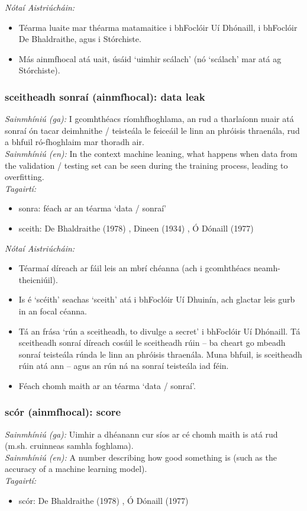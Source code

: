  \noindent \textit{Nótaí Aistriúcháin:}
\begin{itemize}
	\item Téarma luaite mar théarma matamaitice i bhFoclóir Uí Dhónaill, i bhFoclóir De Bhaldraithe, agus i Stórchiste.
	\item Más ainmfhocal atá uait, úsáid `uimhir scálach' (nó `scálach' mar atá ag Stórchiste).
\end{itemize}


\subsubsection*{sceitheadh sonraí (ainmfhocal): data leak}
 \noindent \textit{Sainmhíniú (ga):} I gcomhthéacs ríomhfhoghlama, an rud a tharlaíonn nuair atá sonraí ón tacar deimhnithe / teisteála le feiceáil le linn an phróisis thraenála, rud a bhfuil ró-fhoghlaim mar thoradh air.
\\
 \noindent \textit{Sainmhíniú (en):} In the context machine leaning, what happens when data from the validation / testing set can be seen during the training process, leading to overfitting.
\\
 \noindent \textit{Tagairtí:}
\begin{itemize}
	\item sonra: féach ar an téarma `data / sonraí'
	\item sceith: De Bhaldraithe (1978) \cite{de-bhaldraithe}, Dineen (1934) \cite{dineen}, Ó Dónaill (1977) \cite{odonaill}
\end{itemize}

 \noindent \textit{Nótaí Aistriúcháin:}
\begin{itemize}
	\item Téarmaí díreach ar fáil leis an mbrí chéanna (ach i gcomhthéacs neamh-theicniúil).
	\item Is é `scéith' seachas `sceith' atá i bhFoclóir Uí Dhuinín, ach glactar leis gurb in an focal céanna.
	\item Tá an frása `rún a sceitheadh, to divulge a secret' i bhFoclóir Uí Dhónaill. Tá sceitheadh sonraí díreach cosúil le sceitheadh rúin -- ba cheart go mbeadh sonraí teisteála rúnda le linn an phróisis thraenála. Muna bhfuil, is sceitheadh rúin atá ann -- agus an rún ná na sonraí teisteála iad féin.
	\item Féach chomh maith ar an téarma `data / sonraí'.
\end{itemize}


\subsubsection*{scór (ainmfhocal): score}
 \noindent \textit{Sainmhíniú (ga):} Uimhir a dhéanann cur síos ar cé chomh maith is atá rud (m.sh. cruinneas samhla foghlama).
\\
 \noindent \textit{Sainmhíniú (en):} A number describing how good something is (such as the accuracy of a machine learning model).
\\
 \noindent \textit{Tagairtí:}
\begin{itemize}
	\item scór: De Bhaldraithe (1978) \cite{de-bhaldraithe}, Ó Dónaill (1977) \cite{odonaill}
\end{itemize}

